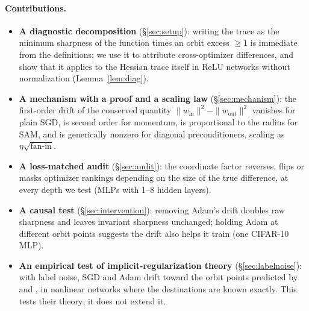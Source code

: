 \documentclass[10pt,twocolumn]{article}
\theoremstyle{remark}
\begin{document}
\paragraph{Contributions.}
\begin{itemize}[leftmargin=1.1em,itemsep=1pt,topsep=2pt]
\item \textbf{A diagnostic decomposition} (\S\ref{sec:setup}): writing the trace as the minimum sharpness of the function \citep{ibayashi2021minimum} times an orbit excess $\ge1$ is immediate from the definitions; we use it to attribute cross-optimizer differences, and show that it applies to the Hessian trace itself in ReLU networks without normalization (Lemma~\ref{lem:diag}).
\item \textbf{A mechanism with a proof and a scaling law} (\S\ref{sec:mechanism}): the first-order drift of the conserved quantity $\|w_{\mathrm{in}}\|^2-\|w_{\mathrm{out}}\|^2$ vanishes for plain SGD, is second order for momentum, is proportional to the radius for SAM, and is generically nonzero for diagonal preconditioners, scaling as $\eta\sqrt{\text{fan-in}}$.
\item \textbf{A loss-matched audit} (\S\ref{sec:audit}): the coordinate factor reverses, flips or masks optimizer rankings depending on the size of the true difference, at every depth we test (MLPs with 1--8 hidden layers).
\item \textbf{A causal test} (\S\ref{sec:intervention}): removing Adam's drift doubles raw sharpness and leaves invariant sharpness unchanged; holding Adam at different orbit points suggests the drift also helps it train (one CIFAR-10 MLP).
\item \textbf{An empirical test of implicit-regularization theory} (\S\ref{sec:labelnoise}): with label noise, SGD and Adam drift toward the orbit points predicted by \citet{damian2021label} and \citet{li2025adam}, in nonlinear networks where the destinations are known exactly. This tests their theory; it does not extend it.
\end{itemize}

\end{document}
